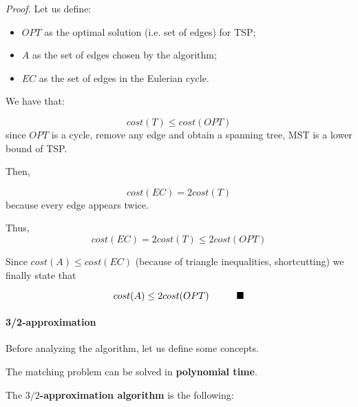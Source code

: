 \textit{Proof.} Let us define:

\begin{itemize}
    \item $OPT$ as the optimal solution (i.e. set of edges) for TSP;
    \item $A$ as the set of edges chosen by the algorithm;
    \item $EC$ as the set of edges in the Eulerian cycle.
\end{itemize}

We have that:

$$cost(T) \leq cost(OPT)$$ since $OPT$ is a cycle, remove any edge and obtain a spanning tree, MST is a lower bound of TSP. 

Then,

$$cost(EC) = 2cost(T)$$ because every edge appears twice. 

Thus, $$cost(EC) = 2cost(T) \leq 2cost(OPT)$$

Since $cost(A) \leq cost(EC)$ (because of triangle inequalities, shortcutting) we finally state that

$$cost(A) \leq 2cost(OPT) \hspace{10mm} \blacksquare$$

\paragraph{3/2-approximation}

Before analyzing the algorithm, let us define some concepts.




The matching problem can be solved in \textbf{polynomial time}.

The \textbf{$3/2$-approximation algorithm} is the following:

